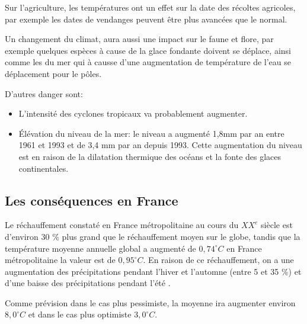 \documentclass[a4paper,10pt]{article}
\begin{document}
Sur  l'agriculture, les  températures  ont un  effet  sur la  date des  récoltes
agricoles, par exemple les dates de vendanges peuvent être plus avancées que le normal.

Un  changement du  climat, aura  aussi une  impact sur  le faune  et  flore, par
exemple quelques espèces à cause de  la glace fondante doivent se déplace, ainsi
comme les  du mer  qui à causse  d'une augmentation  de température de  l'eau se
déplacement pour le pôles.

D'autres danger sont:
\begin{itemize}
\item L'intensité des cyclones tropicaux va probablement augmenter.
\item Élévation  du niveau de la  mer: le niveau  a augmenté 1,8mm par  an entre
  1961 et 1993 et de 3,4 mm par an depuis 1993. Cette augmentation du niveau est
  en raison de la dilatation thermique des océans et la fonte des glaces continentales.
\end{itemize}


\subsection{Les conséquences en France}


Le réchauffement constaté en France métropolitaine au cours du $XX^e$ siècle 
est d’environ 30  \% plus grand que le réchauffement moyen  sur le globe, tandis
que  la température  moyenne annuelle  global a  augmenté de  $0,74^{\circ}C$ en
France métropolitaine la valeur est de $0,95^{\circ}C$.%
En raison de ce réchauffement, on a une augmentation des précipitations
pendant l'hiver et l'automne (entre 5 et 35 \%) et d’une baisse des précipitations
pendant l'été\cite{DOCFRANCE} . 

Comme prévision dans le cas plus pessimiste,  la moyenne ira augmenter environ $8,0^{\circ}C$ et
dans le cas plus optimiste $3,0^{\circ}C$.

\end{document}
